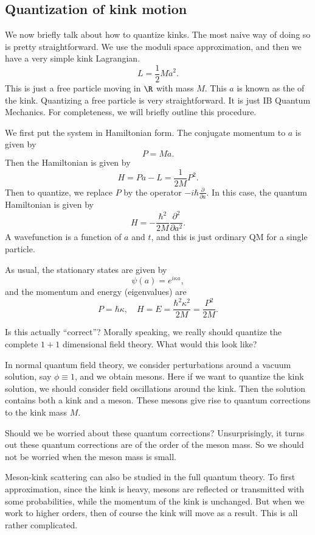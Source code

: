 \documentclass[a4paper]{article}
\begin{document}
\subsection{Quantization of kink motion}
We now briefly talk about how to quantize kinks. The most naive way of doing so is pretty straightforward. We use the moduli space approximation, and then we have a very simple kink Lagrangian.
\[
  L = \frac{1}{2} M \dot{a}^2.
\]
This is just a free particle moving in $\R$ with mass $M$. This $a$ is known as the  of the kink. Quantizing a free particle is very straightforward. It is just IB Quantum Mechanics. For completeness, we will briefly outline this procedure.

We first put the system in Hamiltonian form. The conjugate momentum to $a$ is given by
\[
  P = M \dot{a}.
\]
Then the Hamiltonian is given by
\[
  H = P \dot{a} - L = \frac{1}{2M} P^2.
\]
Then to quantize, we replace $P$ by the operator $-i\hbar \frac{\partial}{\partial a}$. In this case, the quantum Hamiltonian is given by
\[
  H = - \frac{\hbar^2}{2M} \frac{\partial^2}{\partial a^2}.
\]
A wavefunction is a function of $a$ and $t$, and this is just ordinary QM for a single particle.

As usual, the stationary states are given by
\[
  \psi(a) = e^{i\kappa a},
\]
and the momentum and energy (eigenvalues) are
\[
  P = \hbar \kappa,\quad H = E = \frac{\hbar^2 \kappa^2}{2M} = \frac{P^2}{2M}.
\]

Is this actually ``correct''? Morally speaking, we really should quantize the complete $1 + 1$ dimensional field theory. What would this look like?

In normal quantum field theory, we consider perturbations around a vacuum solution, say $\phi \equiv 1$, and we obtain mesons. Here if we want to quantize the kink solution, we should consider field oscillations around the kink. Then the solution contains both a kink and a meson. These mesons give rise to quantum corrections to the kink mass $M$.

Should we be worried about these quantum corrections? Unsurprisingly, it turns out these quantum corrections are of the order of the meson mass. So we should not be worried when the meson mass is small.

Meson-kink scattering can also be studied in the full quantum theory. To first approximation, since the kink is heavy, mesons are reflected or transmitted with some probabilities, while the momentum of the kink is unchanged. But when we work to higher orders, then of course the kink will move as a result. This is all rather complicated.
\end{document}
